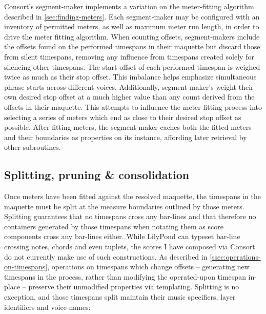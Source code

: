 Consort's segment-maker implements a variation on the meter-fitting algorithm
described in \autoref{sec:finding-meters}. Each segment-maker may be configured
with an inventory of permitted meters, as well as maximum meter run length, in
order to drive the meter fitting algorithm. When counting offsets,
segment-makers include the offsets found on the performed timespans in their
maquette but discard those from silent timespans, removing any influence from
timespans created solely for silencing other timespans. The start offset of
each performed timespan is weighed twice as much as their stop offset. This
imbalance helps emphasize simultaneous phrase starts across different voices.
Additionally, segment-maker's weight their own desired stop offset at a much
higher value than any count derived from the offsets in their maquette. This
attempts to influence the meter fitting process into selecting a series of
meters which end as close to their desired stop offset as possible. After
fitting meters, the segment-maker caches both the fitted meters and their
boundaries as properties on its instance, affording later retrieval by other
subroutines.

\subsection{Splitting, pruning \& consolidation}
\label{ssec:splitting-pruning-and-consolidation}

Once meters have been fitted against the resolved maquette, the timespans in
the maquette must be split at the measure boundaries outlined by those meters.
Splitting guarantees that no timespans cross any bar-lines and that therefore
no containers generated by those timespans when notating them as score
components cross any bar-lines either. While LilyPond can typeset bar-line
crossing notes, chords and even tuplets, the scores I have composed via Consort
do not currently make use of such constructions. As described in
\autoref{ssec:operations-on-timespans}, operations on timespans which change
offsets -- generating new timespans in the process, rather than modifying the
operated-upon timespan in-place -- preserve their unmodified properties via
templating. Splitting is no exception, and those timespans split maintain their
music specifiers, layer identifiers and voice-names:

\begin{comment}
<abjad>
performed_timespan = consort.PerformedTimespan(
    layer=3,
    start_offset=(1, 2),
    stop_offset=(13, 8),
    voice_name='Percussion Voice',
    )
shards = performed_timespan.split_at_offset((9, 16))
print(format(shards))
</abjad>
\end{comment}

